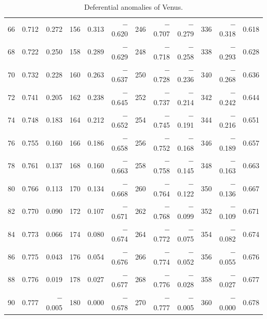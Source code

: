 \begin{table}[!h]
{\begin{tabular}{rrr|rrr|rrr|rrr}
 66 &   0.712 &  0.272 & 156 &   0.313 & $-$0.620 & 246 &  $-$0.707 & $-$0.279 & 336 &  $-$0.318 &  0.618\\
 68 &   0.722 &  0.250 & 158 &   0.289 & $-$0.629 & 248 &  $-$0.718 & $-$0.258 & 338 &  $-$0.293 &  0.628\\
 70 &   0.732 &  0.228 & 160 &   0.263 & $-$0.637 & 250 &  $-$0.728 & $-$0.236 & 340 &  $-$0.268 &  0.636\\
 72 &   0.741 &  0.205 & 162 &   0.238 & $-$0.645 & 252 &  $-$0.737 & $-$0.214 & 342 &  $-$0.242 &  0.644\\
 74 &   0.748 &  0.183 & 164 &   0.212 & $-$0.652 & 254 &  $-$0.745 & $-$0.191 & 344 &  $-$0.216 &  0.651\\
 76 &   0.755 &  0.160 & 166 &   0.186 & $-$0.658 & 256 &  $-$0.752 & $-$0.168 & 346 &  $-$0.189 &  0.657\\
 78 &   0.761 &  0.137 & 168 &   0.160 & $-$0.663 & 258 &  $-$0.758 & $-$0.145 & 348 &  $-$0.163 &  0.663\\
 80 &   0.766 &  0.113 & 170 &   0.134 & $-$0.668 & 260 &  $-$0.764 & $-$0.122 & 350 &  $-$0.136 &  0.667\\
 82 &   0.770 &  0.090 & 172 &   0.107 & $-$0.671 & 262 &  $-$0.768 & $-$0.099 & 352 &  $-$0.109 &  0.671\\
 84 &   0.773 &  0.066 & 174 &   0.080 & $-$0.674 & 264 &  $-$0.772 & $-$0.075 & 354 &  $-$0.082 &  0.674\\
 86 &   0.775 &  0.043 & 176 &   0.054 & $-$0.676 & 266 &  $-$0.774 & $-$0.052 & 356 &  $-$0.055 &  0.676\\
 88 &   0.776 &  0.019 & 178 &   0.027 & $-$0.677 & 268 &  $-$0.776 & $-$0.028 & 358 &  $-$0.027 &  0.677\\
 90 &   0.777 & $-$0.005 & 180 &   0.000 & $-$0.678 & 270 &  $-$0.777 & $-$0.005 & 360 &  $-$0.000 &  0.678\\
\end{tabular}}
\caption{Deferential anomalies of Venus.}\label{vt18}
\end{table}

